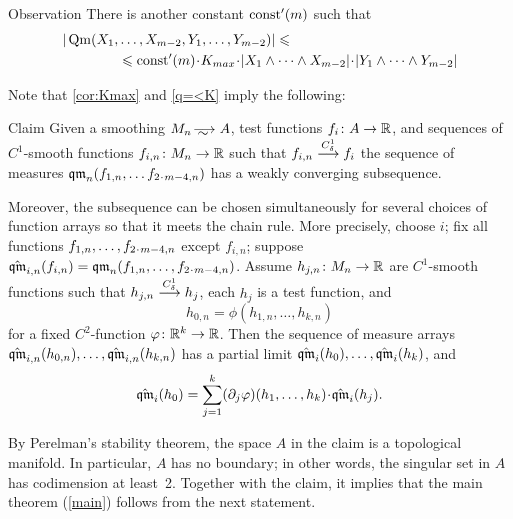 \begin{thm}{Observation}\label{q=<K}
There is another constant $\mathrm{const}'(m)$ such that 
\begin{align*}
|\Qm(X_1,&\dots,X_{m-2},Y_1,\dots,Y_{m-2})|\le
\\
&\le 
\const'(m)\cdot K_{max}\cdot|X_1\wedge\dots\wedge X_{m-2}|\cdot |Y_1\wedge\dots\wedge Y_{m-2}|
\end{align*}

\end{thm}

Note that \ref{cor:Kmax} and \ref{q=<K} imply the following:

\begin{thm}{Claim}\label{clm:weak-partial-limit}
Given a smoothing $M_n\smooths{} A$,
test functions $f_i\:A\zz\to \RR$,
and sequences of $C^1$-smooth functions $f_{i,n}\colon M_n\to \mathbb{R}$ such that 
$f_{i,n}\zz\smoothto f_i$ the sequence of measures 
$\qm_n(f_{1,n},\zz\dots f_{2\cdot m-4,n})$ has a weakly converging subsequence.

Moreover, the subsequence can be chosen simultaneously for several choices of function arrays so that it meets the chain rule.
More precisely, choose $i$; fix all functions $f_{1,n},\zz\dots, f_{2\cdot m-4,n}$ except $f_{i,n}$;
suppose $\hat\qm_{i,n}(f_{i,n})=\qm_n(f_{1,n},\zz\dots, f_{2\cdot m-4,n})$.
Assume $h_{j,n}\colon M_n\to \mathbb{R}$ are $C^1$-smooth functions such that 
$h_{j,n}\zz\smoothto h_j$, each $h_j$ is a test function, and 
\[h_{0,n}=\phi(h_{1,n},\dots,h_{k,n})\]
for a fixed $C^2$-function $\varphi\colon\mathbb{R}^k\to\mathbb{R}$.
Then the sequence of measure arrays $\hat\qm_{i,n}(h_{0,n}),\zz\dots,\hat\qm_{i,n}(h_{k,n})$
has a partial limit $\hat\qm_{i}(h_0),\zz\dots,\hat\qm_{i}(h_k)$, and
\[\hat\qm_{i}(h_0)=\sum_{j=1}^k (\partial_j\phi)(h_1,\dots,h_k)\cdot\hat\qm_{i}(h_j).\]

\end{thm}


By Perelman's stability theorem, the space $A$ in the claim is a topological manifold.
In particular, $A$ has no boundary;
in other words, the singular set in $A$ has codimension at least~2.
Together with the claim, it implies that the main theorem (\ref{main}) follows from the next statement.

